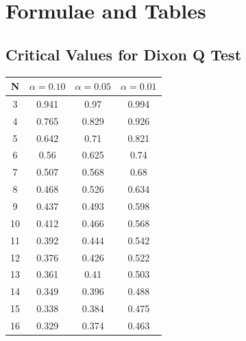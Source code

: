 \documentclass[a4paper,12pt]{article}
\begin{document}
%

\newpage


\section*{Formulae and Tables}
\subsection*{Critical Values for Dixon Q Test}
{
	\Large
	\begin{center}
		\begin{tabular}{|c|c|c|c|}
			\hline  N  & $\alpha=0.10$  & $\alpha=0.05$  & $\alpha=0.01$  \\ \hline
			3  & 0.941 & 0.97  & 0.994 \\ \hline
			4  & 0.765 & 0.829 & 0.926 \\ \hline
			5  & 0.642 & 0.71  & 0.821 \\ \hline
			6  & 0.56  & 0.625 & 0.74  \\ \hline
			7  & 0.507 & 0.568 & 0.68  \\ \hline
			8  & 0.468 & 0.526 & 0.634 \\ \hline
			9  & 0.437 & 0.493 & 0.598 \\ \hline
			10 & 0.412 & 0.466 & 0.568 \\ \hline
			11 & 0.392 & 0.444 & 0.542 \\ \hline
			12 & 0.376 & 0.426 & 0.522 \\ \hline
			13 & 0.361 & 0.41  & 0.503 \\ \hline
			14 & 0.349 & 0.396 & 0.488 \\ \hline
			15 & 0.338 & 0.384 & 0.475 \\ \hline
			16 & 0.329 & 0.374 & 0.463 \\ \hline
		\end{tabular} 
	\end{center}
}
\end{document}
